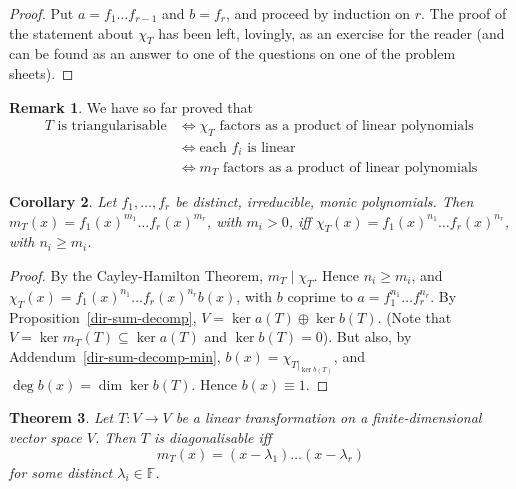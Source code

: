 \documentclass[10pt,fleqn]{article}
\newcommand{\field}{\mathbb{F}}
\theoremstyle{definition} \newtheorem{defn}{Definition}[section]
\theoremstyle{plain}      \newtheorem{thm}[defn]{Theorem}
\theoremstyle{plain}      \newtheorem{prop}[defn]{Proposition}
\theoremstyle{plain}      \newtheorem{lem}[defn]{Lemma}
\theoremstyle{plain}      \newtheorem{cor}[defn]{Corollary}
\theoremstyle{plain}      \newtheorem{ad}[defn]{Addendum}
\theoremstyle{definition} \newtheorem{ex}[defn]{Example}
\theoremstyle{definition} \newtheorem{rem}[defn]{Remark}
\numberwithin{equation}{subsection}
\begin{document}
\begin{proof}
    Put $a=f_1\ldots f_{r-1}$ and $b=f_r$, and proceed by induction on $r$.
    The proof of the statement about $\chi_T$ has been left, lovingly, as an exercise for the reader (and can be found as an answer to one of the questions on one of the problem sheets).
\end{proof}

\begin{rem}
    We have so far proved that
    \begin{align*}
        T\text{ is triangularisable}
        &\iff
        \chi_T\text{ factors as a product of linear polynomials}\\
        &\iff
        \text{each }f_i\text{ is linear}\\
        &\iff
        m_T\text{ factors as a product of linear polynomials}
    \end{align*}
\end{rem}

\begin{cor}
    Let $f_1,\ldots,f_r$ be distinct, irreducible, monic polynomials.
    Then $m_T(x)=f_1(x)^{m_1}\ldots f_r(x)^{m_r}$, with $m_i>0$, iff $\chi_T(x)=f_1(x)^{n_1}\ldots f_r(x)^{n_r}$, with $n_i\geq m_i$.
\end{cor}

\begin{proof}
    By the Cayley-Hamilton Theorem, $m_T\mid\chi_T$.
    Hence $n_i\geq m_i$, and $\chi_T(x)=f_1(x)^{n_1}\ldots f_r(x)^{n_r}b(x)$, with $b$ coprime to $a=f_1^{n_1}\ldots f_r^{n_r}$.
    By Proposition~\ref{dir-sum-decomp}, $V=\ker a(T)\oplus\ker b(T)$.
    (Note that $V=\ker m_T(T)\subseteq\ker a(T)$ and $\ker b(T)=0$).
    But also, by Addendum~\ref{dir-sum-decomp-min}, $b(x)=\chi_{T|_{\ker b(T)}}$, and $\deg b(x)=\dim\ker b(T)$.
    Hence $b(x)\equiv1$.
\end{proof}

\begin{thm}
    Let $T:V\to V$ be a linear transformation on a finite-dimensional vector space $V$.
    Then $T$ is diagonalisable iff
    \[
        m_T(x)=(x-\lambda_1)\ldots(x-\lambda_r)
    \]
    for some distinct $\lambda_i\in\field$.
\end{thm}
\end{document}
